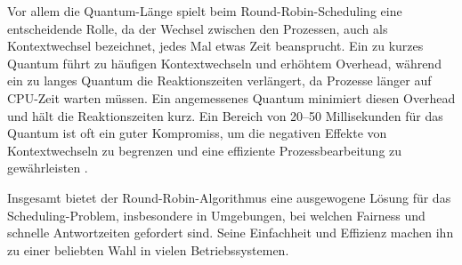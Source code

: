 Vor allem die Quantum-Länge spielt beim Round-Robin-Scheduling eine entscheidende Rolle, da der Wechsel zwischen den Prozessen, auch als Kontextwechsel bezeichnet, jedes Mal etwas Zeit beansprucht. Ein zu kurzes Quantum führt zu häufigen Kontextwechseln und erhöhtem Overhead, während ein zu langes Quantum die Reaktionszeiten verlängert, da Prozesse länger auf CPU-Zeit warten müssen. Ein angemessenes Quantum minimiert diesen Overhead und hält die Reaktionszeiten kurz. Ein Bereich von 20–50 Millisekunden für das Quantum ist oft ein guter Kompromiss, um die negativen Effekte von Kontextwechseln zu begrenzen und eine effiziente Prozessbearbeitung zu gewährleisten \cite[S.158 f.]{Tanenbaum.2024}.

Insgesamt bietet der Round-Robin-Algorithmus eine ausgewogene Lösung für das Scheduling-Problem, insbesondere in Umgebungen, bei welchen Fairness und schnelle Antwortzeiten gefordert sind. Seine Einfachheit und Effizienz machen ihn zu einer beliebten Wahl in vielen Betriebssystemen.
